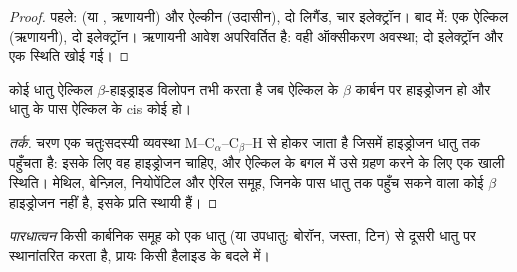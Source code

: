 \begin{proof}
पहले:  (या , ऋणायनी) और ऐल्कीन (उदासीन), दो लिगैंड, चार इलेक्ट्रॉन।
बाद में: एक ऐल्किल (ऋणायनी), दो इलेक्ट्रॉन। ऋणायनी आवेश अपरिवर्तित है: वही
ऑक्सीकरण अवस्था; दो इलेक्ट्रॉन और एक स्थिति खोई गई।
\end{proof}

\begin{proposition}[$\beta$-हाइड्राइड विलोपन की शर्तें]\label{prop:b2:catalytic-cycles:beta-h}
कोई धातु ऐल्किल $\beta$-हाइड्राइड विलोपन तभी करता है जब ऐल्किल के
$\beta$ कार्बन पर हाइड्रोजन हो और धातु के पास ऐल्किल के cis कोई  हो।
\end{proposition}

\begin{proof}[तर्क]
चरण एक चतुःसदस्यी व्यवस्था M--C$_\alpha$--C$_\beta$--H से होकर जाता है जिसमें
हाइड्रोजन धातु तक पहुँचता है: इसके लिए वह हाइड्रोजन चाहिए, और ऐल्किल के बगल में उसे ग्रहण करने के लिए
एक खाली स्थिति। मेथिल, बेन्ज़िल, नियोपेंटिल और ऐरिल समूह, जिनके पास धातु तक पहुँच सकने वाला कोई $\beta$ हाइड्रोजन
नहीं है, इसके प्रति स्थायी हैं।
\end{proof}

\begin{definition}[पारधात्वन]\label{def:b2:catalytic-cycles:transmetalation}
\emph{पारधात्वन} किसी कार्बनिक समूह को एक धातु
(या उपधातु: बोरॉन, जस्ता, टिन) से दूसरी धातु पर स्थानांतरित करता है, प्रायः किसी हैलाइड के बदले में।
\end{definition}

